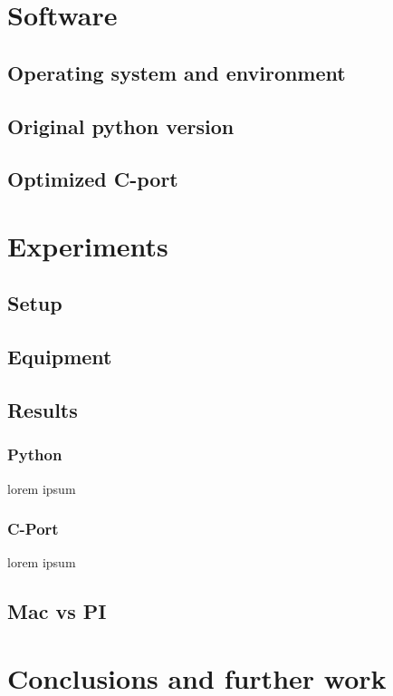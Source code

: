 \documentclass[a4paper, 12pt]{article}
\begin{document}
\section{Software}
\subsection{Operating system and environment}
\subsection{Original python version}
\subsection{Optimized C-port}

\section{Experiments}
\subsection{Setup}
\subsection{Equipment}
\subsection{Results}
\subsubsection{Python}
lorem ipsum
\subsubsection{C-Port}
lorem ipsum

\subsection{Mac vs PI}

\section{Conclusions and further work}
\end{document}
